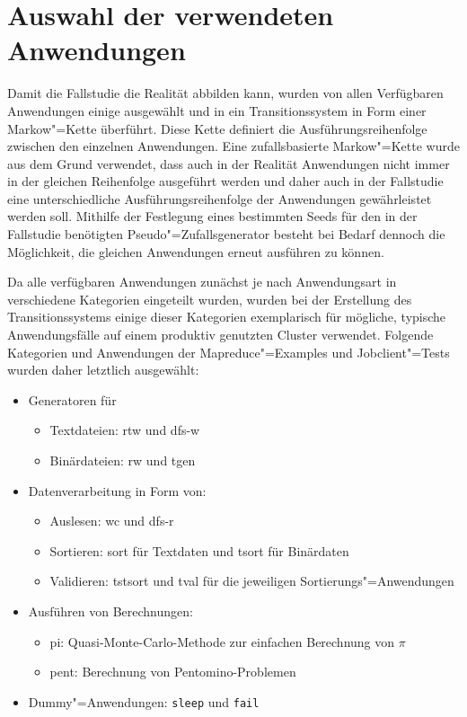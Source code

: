 \section{Auswahl der verwendeten Anwendungen}\label{sec:appSelection}

Damit die Fallstudie die Realität abbilden kann, wurden von allen Verfügbaren Anwendungen einige ausgewählt und in ein Transitionssystem in Form einer Markow"=Kette überführt. Diese Kette definiert die Ausführungsreihenfolge zwischen den einzelnen Anwendungen. Eine zufallsbasierte Markow"=Kette wurde aus dem Grund verwendet, dass auch in der Realität Anwendungen nicht immer in der gleichen Reihenfolge ausgeführt werden und daher auch in der Fallstudie eine unterschiedliche Ausführungsreihenfolge der Anwendungen gewährleistet werden soll. Mithilfe der Festlegung eines bestimmten Seeds für den in der Fallstudie benötigten Pseudo"=Zufallsgenerator besteht bei Bedarf dennoch die Möglichkeit, die gleichen Anwendungen erneut ausführen zu können.

Da alle verfügbaren Anwendungen zunächst je nach Anwendungsart in verschiedene Kategorien eingeteilt wurden, wurden bei der Erstellung des Transitionssystems einige dieser Kategorien exemplarisch für mögliche, typische Anwendungsfälle auf einem produktiv genutzten Cluster verwendet. Folgende Kategorien und Anwendungen der Mapreduce"=Examples und Jobclient"=Tests wurden daher letztlich ausgewählt:

\begin{itemize}
    \item Generatoren für
    \begin{itemize}
        \item Textdateien: \ac{rtw} und \ac{dfs-w}
        \item Binärdateien: \ac{rw} und \ac{tgen}
    \end{itemize}

    \item Datenverarbeitung in Form von:
    \begin{itemize}
        \item Auslesen: \ac{wc} und \ac{dfs-r}
        \item Sortieren: \acl{sort} für Textdaten und \ac{tsort} für Binärdaten
        \item Validieren: \ac{tstsort} und \ac{tval} für die jeweiligen Sortierungs"=Anwendungen
    \end{itemize}

    \item Ausführen von Berechnungen:
    \begin{itemize}
        \item \acl{pi}: Quasi-Monte-Carlo-Methode zur einfachen Berechnung von $\pi$ 
        \item \ac{pent}: Berechnung von Pentomino-Problemen
    \end{itemize}

    \item Dummy"=Anwendungen: \texttt{sleep} und \texttt{fail}
\end{itemize}

